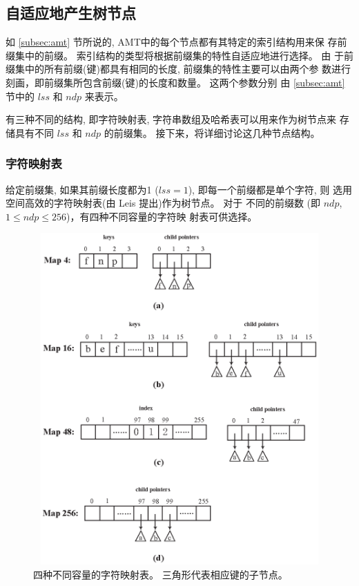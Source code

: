 \subsection{自适应地产生树节点}
\label{subsec:nodes}

如 \ref{subsec:amt} 节所说的, AMT中的每个节点都有其特定的索引结构用来保
存前缀集中的前缀。 索引结构的类型将根据前缀集的特性自适应地进行选择。 由
于前缀集中的所有前缀(键)都具有相同的长度, 前缀集的特性主要可以由两个参
数进行刻画，即前缀集所包含前缀(键)的长度和数量。 这两个参数分别
由 \ref{subsec:amt} 节中的 $lss$ 和 $ndp$ 来表示。

有三种不同的结构, 即字符映射表, 字符串数组及哈希表可以用来作为树节点来
存储具有不同 $lss$ 和 $ndp$ 的前缀集。 接下来，将详细讨论这几种节点结构。

\noindent\subsubsection{字符映射表}

给定前缀集, 如果其前缀长度都为1 ($lss=1$), 即每一个前缀都是单个字符, 则
选用空间高效的字符映射表(由 Leis \cite{Leis2013} 提出)作为树节点。 对于
不同的前缀数 (即 $ndp$, $1 \leq ndp \leq 256$)，有四种不同容量的字符映
射表可供选择。

\begin{figure}[H]
  \centering
  \includegraphics[height=5in, width=5in]{figures/2_MPM/character_map}
  \caption{四种不同容量的字符映射表。 三角形代表相应键的子节点。}
  \label{fig:character map}
\end{figure}

